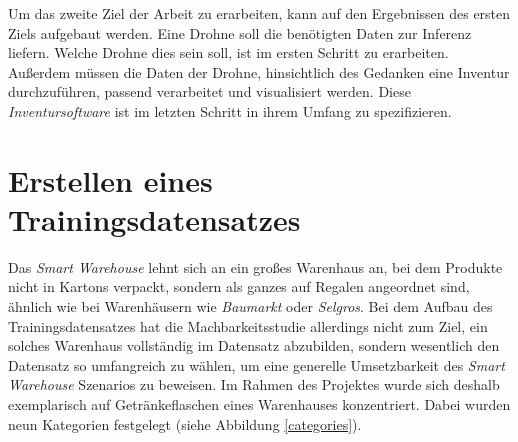 Um das zweite Ziel der Arbeit zu erarbeiten, kann auf den Ergebnissen des ersten Ziels aufgebaut werden. Eine Drohne soll die benötigten Daten zur Inferenz liefern. Welche Drohne dies sein soll, ist im ersten Schritt zu erarbeiten. Außerdem müssen die Daten der Drohne, hinsichtlich des Gedanken eine Inventur durchzuführen, passend verarbeitet und visualisiert werden. Diese \textit{Inventursoftware} ist im letzten Schritt in ihrem Umfang zu spezifizieren.

\section{Erstellen eines Trainingsdatensatzes} \label{traindata}

Das \textit{Smart Warehouse} lehnt sich an ein großes Warenhaus an, bei dem Produkte nicht in Kartons verpackt, sondern als ganzes auf Regalen angeordnet sind, ähnlich wie bei Warenhäusern wie \textit{Baumarkt} oder \textit{Selgros}. Bei dem Aufbau des Trainingsdatensatzes hat die Machbarkeitsstudie allerdings nicht zum Ziel, ein solches Warenhaus vollständig im Datensatz abzubilden, sondern wesentlich den Datensatz so umfangreich zu wählen, um eine generelle Umsetzbarkeit des \textit{Smart Warehouse} Szenarios zu beweisen. Im Rahmen des Projektes wurde sich deshalb exemplarisch auf Getränkeflaschen eines Warenhauses konzentriert. Dabei wurden neun Kategorien festgelegt (siehe Abbildung \ref{categories}). 

